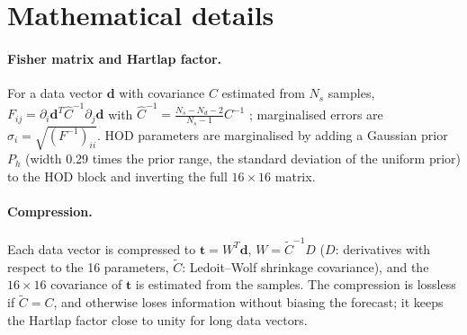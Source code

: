 \documentclass[11pt,twocolumn]{article}
\begin{document}
\section{Mathematical details}
\label{app:maths}

\paragraph{Fisher matrix and Hartlap factor.} For a data vector $\boldsymbol d$ with covariance $C$ estimated from $N_s$ samples, $F_{ij} = \partial_i\boldsymbol d^T \hat C^{-1}\partial_j\boldsymbol d$ with $\hat C^{-1} = \frac{N_s-N_d-2}{N_s-1}C^{-1}$ \cite{Hartlap2007}; marginalised errors are $\sigma_i = \sqrt{(F^{-1})_{ii}}$. HOD parameters are marginalised by adding a Gaussian prior $P_h$ (width 0.29 times the prior range, the standard deviation of the uniform prior) to the HOD block and inverting the full $16\times16$ matrix.

\paragraph{Compression.} Each data vector is compressed to $\boldsymbol t = W^T\boldsymbol d$, $W=\tilde C^{-1}D$ ($D$: derivatives with respect to the 16 parameters, $\tilde C$: Ledoit--Wolf shrinkage covariance), and the $16\times16$ covariance of $\boldsymbol t$ is estimated from the samples. The compression is lossless if $\tilde C=C$, and otherwise loses information without biasing the forecast; it keeps the Hartlap factor close to unity for long data vectors.
\end{document}

